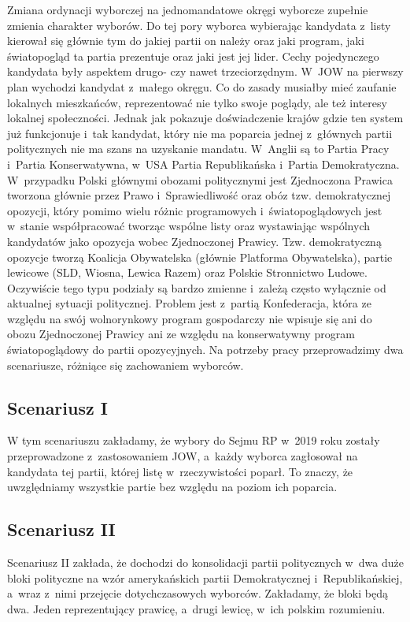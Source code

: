 Zmiana ordynacji wyborczej na jednomandatowe okręgi wyborcze zupełnie zmienia charakter wyborów. Do tej pory wyborca wybierając kandydata z~listy kierował się głównie tym do jakiej partii on należy oraz jaki program, jaki światopogląd ta partia prezentuje oraz jaki jest jej lider. Cechy pojedynczego kandydata były aspektem drugo- czy nawet trzeciorzędnym. W~JOW na pierwszy plan wychodzi kandydat z~małego okręgu. Co do zasady musiałby mieć zaufanie lokalnych mieszkańców, reprezentować nie tylko swoje poglądy, ale też interesy lokalnej społeczności. Jednak jak pokazuje doświadczenie krajów gdzie ten system już funkcjonuje i~tak kandydat, który nie ma poparcia jednej z~głównych partii politycznych nie ma szans na uzyskanie mandatu. W~Anglii są to Partia Pracy i~Partia Konserwatywna, w~USA Partia Republikańska i~Partia Demokratyczna. W~przypadku Polski głównymi obozami politycznymi jest Zjednoczona Prawica tworzona głównie przez Prawo i~Sprawiedliwość oraz obóz tzw. demokratycznej opozycji, który pomimo wielu różnic programowych i~światopoglądowych jest w~stanie współpracować tworząc wspólne listy oraz wystawiając wspólnych kandydatów jako opozycja wobec Zjednoczonej Prawicy. Tzw. demokratyczną opozycje tworzą Koalicja Obywatelska (głównie Platforma Obywatelska), partie lewicowe (SLD, Wiosna, Lewica Razem) oraz Polskie Stronnictwo Ludowe. Oczywiście tego typu podziały są bardzo zmienne i~zależą często wyłącznie od aktualnej sytuacji politycznej. Problem jest z~partią Konfederacja, która ze względu na swój wolnorynkowy program gospodarczy nie wpisuje się ani do obozu Zjednoczonej Prawicy ani ze względu na konserwatywny program światopoglądowy do partii opozycyjnych.
Na potrzeby pracy przeprowadzimy dwa scenariusze, różniące się zachowaniem wyborców.

\subsection{Scenariusz I}
W tym scenariuszu zakładamy, że wybory do Sejmu RP w~2019 roku zostały przeprowadzone z~zastosowaniem JOW, a~każdy wyborca zagłosował na kandydata tej partii, której listę w~rzeczywistości poparł. To znaczy, że uwzględniamy wszystkie partie bez względu na poziom ich poparcia.

\subsection{Scenariusz II}
Scenariusz II zakłada, że dochodzi do konsolidacji partii politycznych w~dwa duże bloki polityczne na wzór amerykańskich partii Demokratycznej i~Republikańskiej, a~wraz z~nimi przejęcie dotychczasowych wyborców. Zakładamy, że bloki będą dwa. Jeden reprezentujący prawicę, a~drugi lewicę, w~ich polskim rozumieniu.

